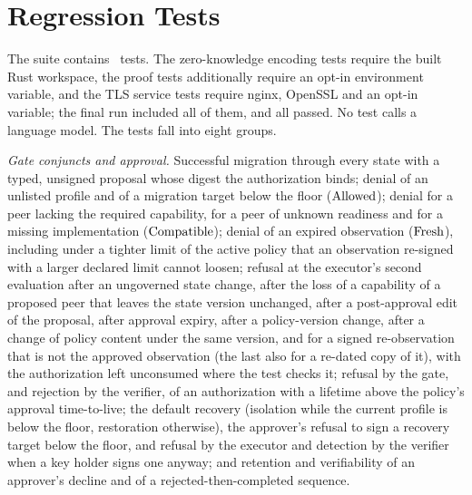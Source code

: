\section{Regression Tests}
\label{s:tests}
The suite contains \NumTests\ tests. The zero-knowledge encoding tests require the built Rust workspace, the proof tests additionally require an opt-in environment variable, and the TLS service tests require nginx, OpenSSL and an opt-in variable; the final run included all of them, and all passed. No test calls a language model. The tests fall into eight groups.

\emph{Gate conjuncts and approval.} Successful migration through every state with a typed, unsigned proposal whose digest the authorization binds; denial of an unlisted profile and of a migration target below the floor ($\mathrm{Allowed}$); denial for a peer lacking the required capability, for a peer of unknown readiness and for a missing implementation ($\mathrm{Compatible}$); denial of an expired observation ($\mathrm{Fresh}$), including under a tighter limit of the active policy that an observation re-signed with a larger declared limit cannot loosen; refusal at the executor's second evaluation after an ungoverned state change, after the loss of a capability of a proposed peer that leaves the state version unchanged, after a post-approval edit of the proposal, after approval expiry, after a policy-version change, after a change of policy content under the same version, and for a signed re-observation that is not the approved observation (the last also for a re-dated copy of it), with the authorization left unconsumed where the test checks it; refusal by the gate, and rejection by the verifier, of an authorization with a lifetime above the policy's approval time-to-live; the default recovery (isolation while the current profile is below the floor, restoration otherwise), the approver's refusal to sign a recovery target below the floor, and refusal by the executor and detection by the verifier when a key holder signs one anyway; and retention and verifiability of an approver's decline and of a rejected-then-completed sequence.

